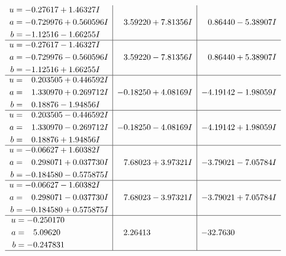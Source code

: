 \documentclass[1p]{elsarticle_modified}
\theoremstyle{definition}
\begin{document}
$$\begin{array}{c|c|c}
\begin{aligned}
u &= -0.27617 + 1.46327 I \\
a &= -0.729976 + 0.560596 I \\
b &= -1.12516 - 1.66255 I\end{aligned}
 & \phantom{-}3.59220 + 7.81356 I & \phantom{-}0.86440 - 5.38907 I \\ \hline\begin{aligned}
u &= -0.27617 - 1.46327 I \\
a &= -0.729976 - 0.560596 I \\
b &= -1.12516 + 1.66255 I\end{aligned}
 & \phantom{-}3.59220 - 7.81356 I & \phantom{-}0.86440 + 5.38907 I \\ \hline\begin{aligned}
u &= \phantom{-}0.203505 + 0.446592 I \\
a &= \phantom{-}1.330970 + 0.269712 I \\
b &= \phantom{-}0.18876 - 1.94856 I\end{aligned}
 & -0.18250 + 4.08169 I & -4.19142 - 1.98059 I \\ \hline\begin{aligned}
u &= \phantom{-}0.203505 - 0.446592 I \\
a &= \phantom{-}1.330970 - 0.269712 I \\
b &= \phantom{-}0.18876 + 1.94856 I\end{aligned}
 & -0.18250 - 4.08169 I & -4.19142 + 1.98059 I \\ \hline\begin{aligned}
u &= -0.06627 + 1.60382 I \\
a &= \phantom{-}0.298071 + 0.037730 I \\
b &= -0.184580 - 0.575875 I\end{aligned}
 & \phantom{-}7.68023 + 3.97321 I & -3.79021 - 7.05784 I \\ \hline\begin{aligned}
u &= -0.06627 - 1.60382 I \\
a &= \phantom{-}0.298071 - 0.037730 I \\
b &= -0.184580 + 0.575875 I\end{aligned}
 & \phantom{-}7.68023 - 3.97321 I & -3.79021 + 7.05784 I \\ \hline\begin{aligned}
u &= -0.250170\phantom{ +0.000000I} \\
a &= \phantom{-}5.09620\phantom{ +0.000000I} \\
b &= -0.247831\phantom{ +0.000000I}\end{aligned}
 & \phantom{-}2.26413\phantom{ +0.000000I} & -32.7630\phantom{ +0.000000I}\\
 \hline 
 \end{array}$$\newpage
\end{document}
